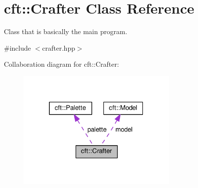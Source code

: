 \hypertarget{classcft_1_1Crafter}{}\section{cft\+:\+:Crafter Class Reference}
\label{classcft_1_1Crafter}


Class that is basically the main program.  




{\ttfamily \#include $<$crafter.\+hpp$>$}



Collaboration diagram for cft\+:\+:Crafter\+:
\nopagebreak
\begin{figure}[H]
\begin{center}
\leavevmode
\includegraphics[width=224pt]{classcft_1_1Crafter__coll__graph}
\end{center}
\end{figure}
